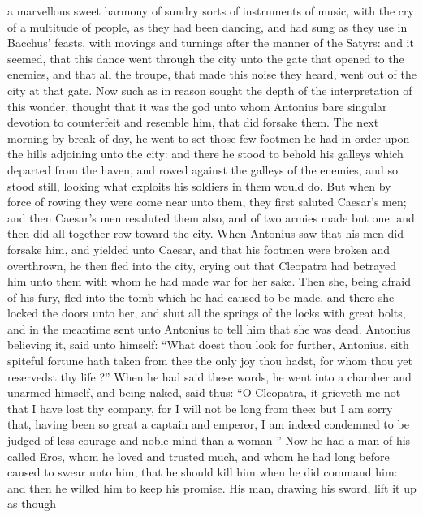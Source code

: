 \documentclass{book}
\begin{document}
a marvellous sweet 
harmony of sundry sorts of instruments of music, with the cry of a
multitude of people, as they had been dancing, and had sung as they
use in Bacchus' feasts, with movings and turnings after the manner
of the Satyrs: and it seemed, that this dance went through the city
unto the gate that opened to the enemies, and that all the troupe,
that made this noise they heard, went out of the city at that gate.
Now such as in reason sought the depth of the interpretation of this
wonder, thought that it was the god unto whom Antonius bare singular
devotion to counterfeit and resemble him, that did forsake them.
The next morning by break of day, he went to set those few footmen
he had in order upon the hills adjoining unto the city: and there he
stood to behold his galleys which departed from the haven, and rowed
against the galleys of the enemies, and so stood still, looking what
exploits his soldiers in them would do. But when by force of rowing
they were come near unto them, they first saluted Caesar's men; and
then Caesar's men resaluted them also, and of two armies made but one:
and then did all together row toward the city. When  Antonius saw
that his men did forsake him, and yielded unto Caesar, and that his
footmen were broken and overthrown, he then fled into the city, crying
out that Cleopatra had betrayed him unto them with whom he had made
war for her sake. Then she, being afraid of his fury, fled into the
tomb which he had caused to be made, and there she locked the doors
unto her, and shut all the springs of the locks with great bolts, and
in the meantime sent unto Antonius to tell him that she was dead.
Antonius believing it, said unto himself: ``What doest thou look for
further, Antonius, sith spiteful fortune hath taken from thee the
only joy thou hadst, for whom thou yet reservedst thy life ?'' When
he had said these words, he went into a chamber and unarmed himself,
and being naked, said thus: ``O Cleopatra, it grieveth me not that I
have lost thy company, for I will not be long from thee: but I am
sorry that, having been so great a captain and emperor, I am indeed
condemned to be judged of less courage and noble mind than a woman
'' Now he had a man of his called Eros, whom he loved and trusted
much, and whom he had long before caused to swear unto him, that he
should kill him when he did command him: and then he willed him to
keep his promise. His man, drawing his sword, lift it up as though
\end{document}
